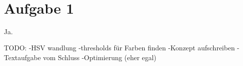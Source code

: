 \documentclass{../Vorlage/mat}
\begin{document}
 \\

\section*{Aufgabe 1}
Ja.

TODO: 
-HSV wandlung
-thresholds für Farben finden
-Konzept aufschreiben
-Textaufgabe vom Schluss
-Optimierung (eher egal)
\end{document}
